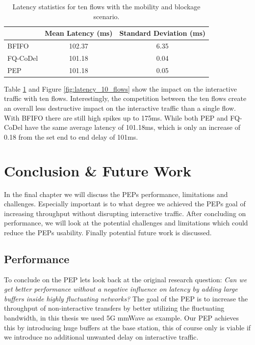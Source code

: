 \documentclass[a4paper,english, 11pt]{report}
\begin{document}
\begin{table}[h!]
\centering
\begin{tabular}{l|c|c}
\hline
 & \textbf{Mean Latency (ms)} & \textbf{Standard Deviation (ms)} \\
\hline
BFIFO   & 102.37 & 6.35 \\
FQ-CoDel  &  101.18 & 0.04 \\
PEP  &  101.18 & 0.05 \\
\end{tabular}
\caption{Latency statistics for ten flows with the mobility and blockage scenario.}
\label{tab:latency_10_flows}
\end{table}

Table \ref{tab:latency_10_flows} and Figure \ref{fig:latency_10_flows} show the impact on the interactive traffic with ten flows. Interestingly, the competition between the ten flows create an overall less destructive impact on the interactive traffic than a single flow. With BFIFO there are still high spikes up to 175ms. While both PEP and FQ-CoDel have the same average latency of 101.18ms, which is only an increase of 0.18 from the set end to end delay of 101ms.\\

\chapter{Conclusion \& Future Work}
In the final chapter we will discuss the PEPs performance, limitations and challenges. Especially important is to what degree we achieved the PEPs goal of increasing throughput without disrupting interactive traffic. After concluding on performance, we will look at the potential challenges and limitations which could reduce the PEPs usability. Finally potential future work is discussed.\\

\section{Performance}
To conclude on the PEP lets look back at the original research question: \textit{Can we get better performance without a negative influence on latency by adding large buffers inside highly fluctuating networks?} The goal of the PEP is to increase the throughput of non-interactive transfers by better utilizing the fluctuating bandwidth, in this thesis we used 5G mmWave as example. Our PEP achieves this by introducing huge buffers at the base station, this of course only is viable if we introduce no additional unwanted delay on interactive traffic.\\
\end{document}
